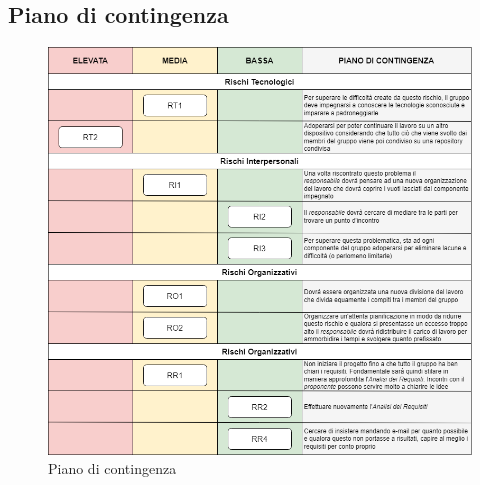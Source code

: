 \subsection{Piano di contingenza} \label{piano_contingenza}
\begin{figure}[H]
	\centering
  \includegraphics[scale=0.6]{immagini/piano_di_contingenza.png}
  \caption{Piano di contingenza}
\end{figure}